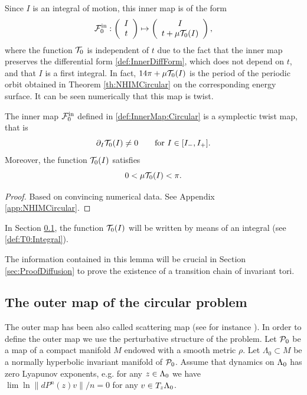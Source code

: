 Since
$I$ is an integral of motion, this inner map is of the form
\begin{equation}\label{def:InnerMap:Circular}
  \mathcal{F}_0^{\mathrm{in}}:\left(\begin{array}{c} I\\
      t
    \end{array}\right)\mapsto \left(\begin{array}{c} I\\
      t+\mu\mathcal{T}_0(I)
    \end{array}\right),
\end{equation}
where the function $\mathcal{T}_0$ is independent of $t$ due to the fact that
the inner map preserves the differential form \eqref{def:InnerDiffForm}, which does not depend on $t$, and that $I$ is a first integral.  In fact, $14\pi+\mu\mathcal{T}_0(I)$ is the period of
the periodic orbit obtained in Theorem \ref{th:NHIMCircular} on the
corresponding energy surface. It can be seen numerically that this map
is twist.

\begin{lemma}\label{lem:TwistInner}
  The inner map $\mathcal{F}_0^{\mathrm{in}}$ defined in \eqref{def:InnerMap:Circular}
  is a symplectic twist map, that is
  \[
  \partial_I \mathcal{T}_0(I)\neq 0\qquad \text{for }I\in [I_-,I_+].
  \]
  Moreover, the function $\mathcal{T}_0(I)$ satisfies
  \begin{equation}\label{eq:IntervalTwist}
    0<\mu\mathcal{T}_0(I)<\pi.
  \end{equation}
\end{lemma}

\begin{proof}
  Based on convincing numerical data. See Appendix \ref{app:NHIMCircular}.
\end{proof}

In Section \ref{sec:Circular:Outer}, the function $\mathcal{T}_0(I)$ will be
written by means of an integral (see \eqref{def:T0:Integral}).

The information contained in this lemma will be crucial in Section \ref{sec:ProofDiffusion}
to prove the existence of a transition chain of invariant tori.

\subsection{The outer map of the circular
  problem}\label{sec:Circular:Outer}

The outer map has been also called scattering map (see for instance
\cite{DelshamsLS08}). 
In order to define the outer map we use the perturbative structure of the problem. 
Let $\mathcal{P}_0$ be a map of a compact manifold $M$ endowed with a smooth metric $\rho$. 
Let $\Lambda_0 \subset M$ be a normally hyperbolic invariant manifold of $\mathcal{P}_0$.
Assume that dynamics on $\Lambda_0$ has zero Lyapunov exponents, e.g. for any 
$z\in \Lambda_0$ we have $\lim \ln \|dP^n(z)v\|/n = 0$ for any $v\in T_z\Lambda_0$.

